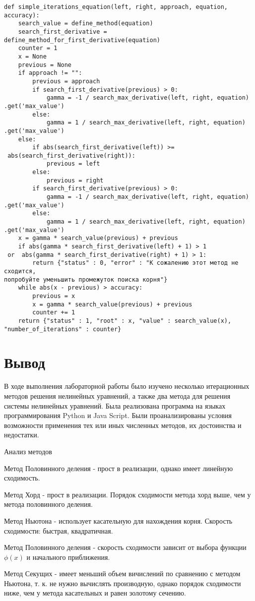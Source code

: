 \documentclass[14pt]{article}
\newcommand\mysection[1]{%
	  \addcontentsline{toc}{section}{#1}%
	  \section*{#1}%
}
\begin{document}
\begin{verbatim}
def simple_iterations_equation(left, right, approach, equation, accuracy):
    search_value = define_method(equation)
    search_first_derivative = define_method_for_first_derivative(equation)
    counter = 1
    x = None
    previous = None
    if approach != "":
        previous = approach
        if search_first_derivative(previous) > 0:
            gamma = -1 / search_max_derivative(left, right, equation)
.get('max_value')
        else:
            gamma = 1 / search_max_derivative(left, right, equation)
.get('max_value')
    else:
        if abs(search_first_derivative(left)) >=
 abs(search_first_derivative(right)):
            previous = left
        else:
            previous = right
        if search_first_derivative(previous) > 0:
            gamma = -1 / search_max_derivative(left, right, equation)
.get('max_value')
        else:
            gamma = 1 / search_max_derivative(left, right, equation)
.get('max_value')
    x = gamma * search_value(previous) + previous
    if abs(gamma * search_first_derivative(left) + 1) > 1
 or  abs(gamma * search_first_derivative(right) + 1) > 1:
        return {"status" : 0, "error" : "К сожалению этот метод не сходится, 
попробуйте уменьшить промежуток поиска корня"}
    while abs(x - previous) > accuracy:
        previous = x
        x = gamma * search_value(previous) + previous
        counter += 1
    return {"status" : 1, "root" : x, "value" : search_value(x), 
"number_of_iterations" : counter}
\end{verbatim}
\mysection{Вывод}
В ходе выполнения лабораторной работы было изучено несколько итерационных методов решения нелинейных уравнений, а также два метода для решения системы нелинейных уравнений. 
Была реализована программа на языках программирования Python и Java Script. Были
проанализированы условия возможности применения тех или иных численных
методов, их достоинства и недостатки. 

Анализ методов

Метод Половинного деления - прост в реализации, однако имеет линейную сходимость.

Метод Хорд - прост в реализации. Порядок сходимости метода хорд выше, чем у
метода половинного деления.

Метод Ньютона - использует касательную для нахождения корня. Скорость
сходимости: быстрая, квадратичная.

Метод Половинного деления - скорость сходимости зависит от выбора функции $ \phi(x)$ и начального
приближения.

Метод Секущих - имеет меньший объем вичислений по сравнению с методом Ньютона, т. к. не нужно вычислять производную, однако порядок сходимости ниже, чем у метода касательных и равен золотому сечению.
\end{document}
